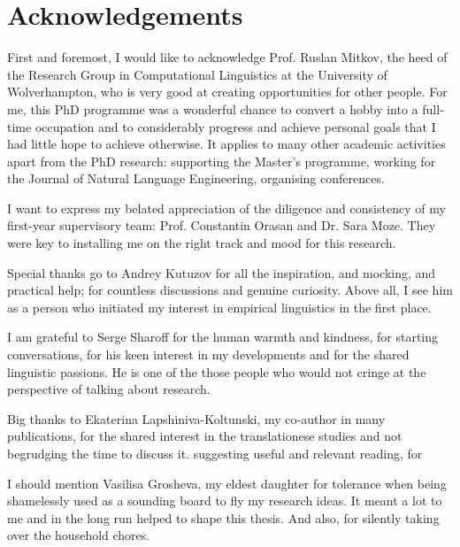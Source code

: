 
\chapter*{Acknowledgements}


First and foremost, I would like to acknowledge Prof. Ruslan Mitkov, the heed of the Research Group in Computational Linguistics at the University of Wolverhampton, who is very good at creating opportunities for other people. For me, this PhD programme was a wonderful chance to convert a hobby into a full-time occupation and to considerably progress and achieve personal goals that I had little hope to achieve otherwise. It applies to many other academic activities apart from the PhD research: supporting the Master's programme, working for the Journal of Natural Language Engineering, organising conferences. 

I want to express my belated appreciation of the diligence and consistency of my first-year supervisory team: Prof. Constantin Orasan and Dr. Sara Moze. They were key to installing me on the right track and mood for this research. 

Special thanks go to Andrey Kutuzov for all the inspiration, and mocking, and practical help; for countless discussions and genuine curiosity. Above all, I see him as a person who initiated my interest in empirical linguistics in the first place.

I am grateful to Serge Sharoff for the human warmth and kindness, for starting conversations, for his keen interest in my developments and for the shared linguistic passions. He is one of the those people who would not cringe at the perspective of talking about research.

Big thanks to Ekaterina Lapshiniva-Koltunski, my co-author in many publications, for the shared interest in the translationese studies and not begrudging the time to discuss it. suggesting useful and relevant reading, for   

I should mention Vasilisa Grosheva, my eldest daughter for tolerance when being shamelessly used as a sounding board to fly my research ideas. It meant a lot to me and in the long run helped to shape this thesis. And also, for silently taking over the household chores.

